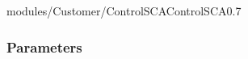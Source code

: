 \begin{htmlonly}
%
\begin{covimg2}{modules/Customer/ControlSCA}{ControlSCA}{0.7}\end{covimg2}



%
%

%
\subsubsection{Parameters}
%



\end{htmlonly}
